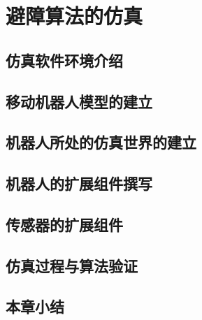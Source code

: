 

\chapter{避障算法的仿真}
\label{chap:simulation}

\section{仿真软件环境介绍}
\section{移动机器人模型的建立}
\section{机器人所处的仿真世界的建立}
\section{机器人的扩展组件撰写}
\section{传感器的扩展组件}
\section{仿真过程与算法验证}
\section{本章小结}
